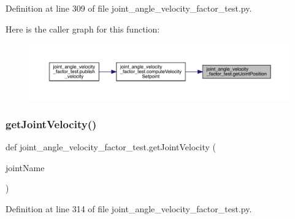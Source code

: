 Definition at line 309 of file joint\+\_\+angle\+\_\+velocity\+\_\+factor\+\_\+test.\+py.


\begin{DoxyCode}{0}

\end{DoxyCode}
Here is the caller graph for this function\+:\nopagebreak
\begin{figure}[H]
\begin{center}
\leavevmode
\includegraphics[width=350pt]{namespacejoint__angle__velocity__factor__test_af3a1b2e70aeffd1b80506e0ecd0ad8a6_icgraph}
\end{center}
\end{figure}
\mbox{\label{namespacejoint__angle__velocity__factor__test_adc327c55cddebfb13f71dd9ace977b3c}} 
\subsubsection{\texorpdfstring{getJointVelocity()}{getJointVelocity()}}
{\footnotesize\ttfamily def joint\+\_\+angle\+\_\+velocity\+\_\+factor\+\_\+test.\+get\+Joint\+Velocity (\begin{DoxyParamCaption}\item[{}]{joint\+Name }\end{DoxyParamCaption})}



Definition at line 314 of file joint\+\_\+angle\+\_\+velocity\+\_\+factor\+\_\+test.\+py.


